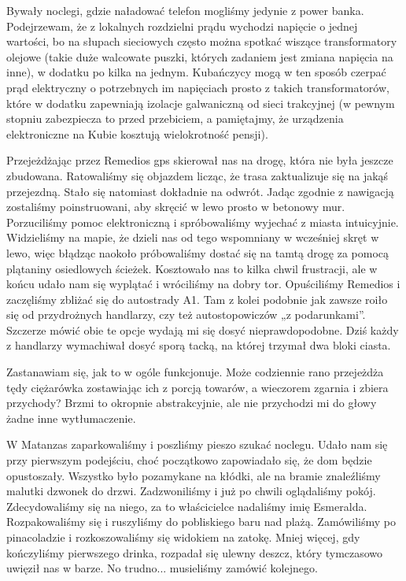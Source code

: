 Bywały noclegi, gdzie naładować telefon mogliśmy jedynie z power banka.
Podejrzewam, że z lokalnych rozdzielni prądu wychodzi napięcie o jednej wartości, bo na słupach sieciowych często można spotkać wiszące transformatory olejowe (takie duże walcowate puszki, których zadaniem jest zmiana napięcia na inne), w dodatku po kilka na jednym.
Kubańczycy mogą w ten sposób czerpać prąd elektryczny o potrzebnych im napięciach prosto z takich transformatorów, które w dodatku zapewniają izolacje galwaniczną od sieci trakcyjnej (w pewnym stopniu zabezpiecza to przed przebiciem, a pamiętajmy, że urządzenia elektroniczne na Kubie kosztują wielokrotność pensji).
\par Przejeżdżając przez Remedios gps skierował nas na drogę, która nie była jeszcze zbudowana.
Ratowaliśmy się objazdem licząc, że trasa zaktualizuje się na jakąś przejezdną.
Stało się natomiast dokładnie na odwrót.
Jadąc zgodnie z nawigacją zostaliśmy poinstruowani, aby skręcić w lewo prosto w betonowy mur.
Porzuciliśmy pomoc elektroniczną i spróbowaliśmy wyjechać z miasta intuicyjnie.
Widzieliśmy na mapie, że dzieli nas od tego wspomniany w wcześniej skręt w lewo, więc błądząc naokoło próbowaliśmy dostać się na tamtą drogę za pomocą plątaniny osiedlowych ścieżek.
Kosztowało nas to kilka chwil frustracji, ale w końcu udało nam się wyplątać i wróciliśmy na dobry tor.
Opuściliśmy Remedios i zaczęliśmy zbliżać się do autostrady A1.
Tam z kolei podobnie jak zawsze roiło się od przydrożnych handlarzy, czy też autostopowiczów „z podarunkami”.
Szczerze mówić obie te opcje wydają mi się dosyć nieprawdopodobne.
Dziś każdy z handlarzy wymachiwał dosyć sporą tacką, na której trzymał dwa bloki ciasta.

\noindent Zastanawiam się, jak to w ogóle funkcjonuje.
Może codziennie rano przejeżdża tędy ciężarówka zostawiając ich z porcją towarów, a wieczorem zgarnia i zbiera przychody?
Brzmi to okropnie abstrakcyjnie, ale nie przychodzi mi do głowy żadne inne wytłumaczenie.
\par W Matanzas zaparkowaliśmy i poszliśmy pieszo szukać noclegu.
Udało nam się przy pierwszym podejściu, choć początkowo zapowiadało się, że dom będzie opustoszały.
Wszystko było pozamykane na kłódki, ale na bramie znaleźliśmy malutki dzwonek do drzwi.
Zadzwoniliśmy i już po chwili oglądaliśmy pokój.
Zdecydowaliśmy się na niego, za to właścicielce nadaliśmy imię Esmeralda.
Rozpakowaliśmy się i ruszyliśmy do pobliskiego baru nad plażą.
Zamówiliśmy po pinacoladzie i rozkoszowaliśmy się widokiem na zatokę.
Mniej więcej, gdy kończyliśmy pierwszego drinka, rozpadał się ulewny deszcz, który tymczasowo uwięził nas w barze.
No trudno...
musieliśmy zamówić kolejnego.